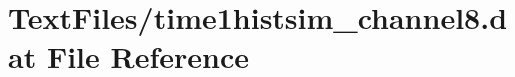 \hypertarget{TextFiles_2time1histsim__channel8_8dat}{}\section{Text\+Files/time1histsim\+\_\+channel8.dat File Reference}
\label{TextFiles_2time1histsim__channel8_8dat}
